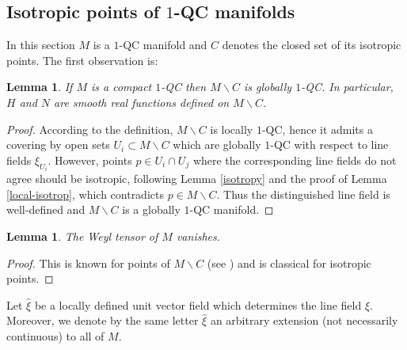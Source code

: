 \documentclass[JEP,XML,SOM,Unicode]{cedram}
\let\moins\smallsetminus
\newtheorem{lemma}[theorem]{Lemma}
\theoremstyle{definition}
\theoremstyle{remark}
\numberwithin{equation}{section}
\begin{document}
\subsection{Isotropic points of $1$-QC manifolds}\label{section-extension}
In this section $M$ is a $1$-QC manifold and $C$ denotes the closed set of its isotropic points.
The first observation is:
\begin{lemma}\label{global}
If $M$ is a compact $1$-QC then $M\moins C$ is globally $1$-QC. In particular, $H$ and $N$ are smooth
real functions defined on $M\moins C$.
\end{lemma}
\begin{proof}
According to the definition, $M\moins C$ is locally $1$-QC, hence it admits a covering by open sets $U_i\subset M\moins C$
which are globally $1$-QC with respect to line fields $\xi_{U_i}$.
However, points $p\in U_i\cap U_j$ where the corresponding line fields do not agree should be
isotropic, following Lemma \ref{isotropy} and the proof of Lemma \ref{local-isotrop}, which
contradicts $p\in M\moins C$. Thus the distinguished
line field is well-defined and $M\moins C$ is a globally $1$-QC manifold.
\end{proof}

\begin{lemma}\label{weyl}
The Weyl tensor of $M$ vanishes.
\end{lemma}
\begin{proof}
This is known for points of $M\moins C$ (see \cite{BF,GM}) and is classical for isotropic points.
\end{proof}

Let $\widehat{\xi}$ be a locally defined unit vector field
which determines the line field $\xi$.
Moreover, we denote by the same letter $\widehat{\xi}$ an arbitrary extension
(not necessarily continuous) to all of $M$.
\end{document}
